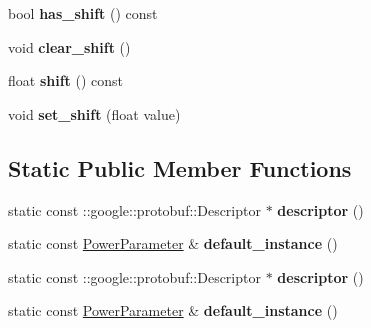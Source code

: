 \begin{DoxyCompactItemize}
bool {\bfseries has\+\_\+shift} () const
\item 
\mbox{\label{classcaffe_1_1_power_parameter_a17780b184ddea16906679a27b0d3f95b}} 
void {\bfseries clear\+\_\+shift} ()
\item 
\mbox{\label{classcaffe_1_1_power_parameter_a7265e37be33178589e7257722d4022af}} 
float {\bfseries shift} () const
\item 
\mbox{\label{classcaffe_1_1_power_parameter_a7ed056f57b1fedb7174f069ab39727f2}} 
void {\bfseries set\+\_\+shift} (float value)
\end{DoxyCompactItemize}
\subsection*{Static Public Member Functions}
\begin{DoxyCompactItemize}
\item 
\mbox{\label{classcaffe_1_1_power_parameter_a3b5cbbd09984a5caca97762921a06f4a}} 
static const \+::google\+::protobuf\+::\+Descriptor $\ast$ {\bfseries descriptor} ()
\item 
\mbox{\label{classcaffe_1_1_power_parameter_a5b04706018e8a55ff2039b4464429f0a}} 
static const \mbox{\hyperlink{classcaffe_1_1_power_parameter}{Power\+Parameter}} \& {\bfseries default\+\_\+instance} ()
\item 
\mbox{\label{classcaffe_1_1_power_parameter_a29383ea4c2c671b393db1ad2df05ebd7}} 
static const \+::google\+::protobuf\+::\+Descriptor $\ast$ {\bfseries descriptor} ()
\item 
\mbox{\label{classcaffe_1_1_power_parameter_a4545d192bbb2aae275199f1ab7176989}} 
static const \mbox{\hyperlink{classcaffe_1_1_power_parameter}{Power\+Parameter}} \& {\bfseries default\+\_\+instance} ()
\end{DoxyCompactItemize}
